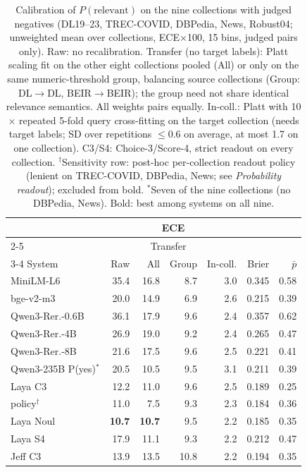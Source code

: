\begin{table}[t]
\centering
\footnotesize
\setlength{\tabcolsep}{1.6pt}
\caption{Calibration of $P(\text{relevant})$ on the nine collections with judged negatives (DL19--23, TREC-COVID, DBPedia, News, Robust04; unweighted mean over collections, ECE$\times$100, 15 bins, judged pairs only). Raw: no recalibration. Transfer (no target labels): Platt scaling fit on the other eight collections pooled (All) or only on the same numeric-threshold group, balancing source collections (Group: DL$\to$DL, BEIR$\to$BEIR); the group need not share identical relevance semantics. All weights pairs equally. In-coll.: Platt with 10$\times$ repeated 5-fold query cross-fitting on the target collection (needs target labels; SD over repetitions $\le$0.6 on average, at most 1.7 on one collection). C3/S4: Choice-3/Score-4, strict readout on every collection. $^\dagger$Sensitivity row: post-hoc per-collection readout policy (lenient on TREC-COVID, DBPedia, News; see \emph{Probability readout}); excluded from bold. $^\ast$Seven of the nine collections (no DBPedia, News). Bold: best among systems on all nine.}
\label{tab:calibration}
\begin{tabular}{lrrrrrr}
\toprule
 & \multicolumn{4}{c}{ECE} & & \\ \cmidrule(lr){2-5}
 & & \multicolumn{2}{c}{Transfer} & & & \\ \cmidrule(lr){3-4}
System & Raw & All & Group & In-coll. & Brier & $\bar{p}$ \\
\midrule
MiniLM-L6 & 35.4 & 16.8 & 8.7 & 3.0 & 0.345 & 0.58 \\
bge-v2-m3 & 20.0 & 14.9 & 6.9 & 2.6 & 0.215 & 0.39 \\
Qwen3-Rer.-0.6B & 36.1 & 17.9 & 9.6 & 2.4 & 0.357 & 0.62 \\
Qwen3-Rer.-4B & 26.9 & 19.0 & 9.2 & 2.4 & 0.265 & 0.47 \\
Qwen3-Rer.-8B & 21.6 & 17.5 & 9.6 & 2.5 & 0.221 & 0.41 \\
Qwen3-235B P(yes)$^\ast$ & 20.5 & 10.5 & 9.5 & 3.1 & 0.211 & 0.39 \\
Laya C3 & 12.2 & 11.0 & 9.6 & 2.5 & 0.189 & 0.25 \\
\quad policy$^\dagger$ & 11.0 & 7.5 & 9.3 & 2.3 & 0.184 & 0.36 \\
Laya Noul & \textbf{10.7} & \textbf{10.7} & 9.5 & 2.2 & 0.185 & 0.35 \\
Laya S4 & 17.9 & 11.1 & 9.3 & 2.2 & 0.212 & 0.47 \\
Jeff C3 & 13.9 & 13.5 & 10.8 & 2.2 & 0.194 & 0.35 \\

\end{tabular}
\end{table}

